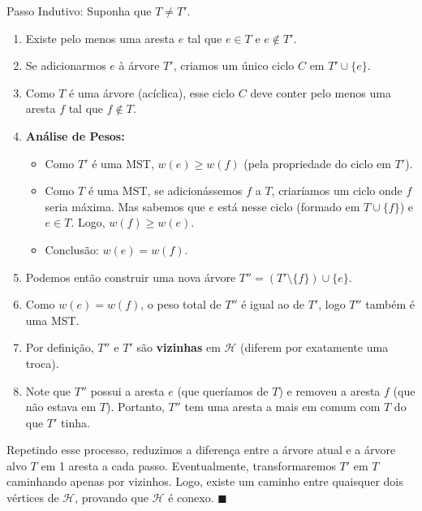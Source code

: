 \documentclass[a4paper,12pt]{article}
\begin{document}
Passo Indutivo: Suponha que $T \neq T'$.
\begin{enumerate}
    \item Existe pelo menos uma aresta $e$ tal que $e \in T$ e $e \notin T'$.
    \item Se adicionarmos $e$ à árvore $T'$, criamos um único ciclo $C$ em $T' \cup \{e\}$.
    \item Como $T$ é uma árvore (acíclica), esse ciclo $C$ deve conter pelo menos uma aresta $f$ tal que $f \notin T$.
    \item \textbf{Análise de Pesos:}
    \begin{itemize}
        \item Como $T'$ é uma MST, $w(e) \ge w(f)$ (pela propriedade do ciclo em $T'$).
        \item Como $T$ é uma MST, se adicionássemos $f$ a $T$, criaríamos um ciclo onde $f$ seria máxima. Mas sabemos que $e$ está nesse ciclo (formado em $T \cup \{f\}$) e $e \in T$. Logo, $w(f) \ge w(e)$.
        \item Conclusão: $w(e) = w(f)$.
    \end{itemize}
    \item Podemos então construir uma nova árvore $T'' = (T' \setminus \{f\}) \cup \{e\}$.
    \item Como $w(e) = w(f)$, o peso total de $T''$ é igual ao de $T'$, logo $T''$ também é uma MST.
    \item Por definição, $T''$ e $T'$ são \textbf{vizinhas} em $\mathcal{H}$ (diferem por exatamente uma troca).
    \item Note que $T''$ possui a aresta $e$ (que queríamos de $T$) e removeu a aresta $f$ (que não estava em $T$). Portanto, $T''$ tem uma aresta a mais em comum com $T$ do que $T'$ tinha.
\end{enumerate}

Repetindo esse processo, reduzimos a diferença entre a árvore atual e a árvore alvo $T$ em 1 aresta a cada passo. Eventualmente, transformaremos $T'$ em $T$ caminhando apenas por vizinhos. Logo, existe um caminho entre quaisquer dois vértices de $\mathcal{H}$, provando que $\mathcal{H}$ é conexo. $\blacksquare$
\end{document}
